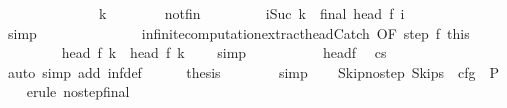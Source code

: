 \begin{isabellebody}
\ \ \ \ \isamarkupfalse%
\ \isanewline
\ \ \ \ \ \ \isamarkupfalse%
\ k\isanewline
\ \ \ \ \ \ \isamarkupfalse%
\ not{\isacharunderscore}fin\ \isanewline
\ \ \ \ \ \ \isamarkupfalse%
\ {\isachardoublequoteopen}{\isasymforall}i{\isacharless}{\isacharparenleft}Suc\ k{\isacharparenright}{\isachardot}\ {\isasymnot}\ final\ {\isacharparenleft}head\ {\isacharparenleft}f\ i{\isacharparenright}{\isacharparenright}{\isachardoublequoteclose}\isanewline
\ \ \ \ \ \ \ \ \isamarkupfalse%
\ simp\isanewline
\ \ \ \ \ \ \isanewline
\ \ \ \ \ \ \isamarkupfalse%
\ infinite{\isacharunderscore}computation{\isacharunderscore}extract{\isacharunderscore}head{\isacharunderscore}Catch\ {\isacharbrackleft}OF\ step\ f{\isacharunderscore}{}\ this\ {\isacharbrackright}\isanewline
\ \ \ \ \ \ \isamarkupfalse%
\ {\isachardoublequoteopen}{\isasymGamma}{\isasymturnstile}\ head\ {\isacharparenleft}f\ k{\isacharparenright}\ {\isasymrightarrow}\ head\ {\isacharparenleft}f\ {\isacharparenleft}k\ {\isacharplus}\ {}{\isacharparenright}{\isacharparenright}{\isachardoublequoteclose}\ \isamarkupfalse%
\ simp\isanewline
\ \ \ \ \isamarkupfalse%
\isanewline
\ \ \ \ \isamarkupfalse%
\ head{\isacharunderscore}f{\isacharunderscore}{}\ \isamarkupfalse%
\ {\isachardoublequoteopen}{\isasymGamma}{\isasymturnstile}{\isacharparenleft}cs{\isacharparenright}\ {\isasymrightarrow}\ {\isasymdots}{\isacharparenleft}{\isasyminfinity}{\isacharparenright}{\isachardoublequoteclose}\isanewline
\ \ \ \ \ \ \isamarkupfalse%
\ {\isacharparenleft}auto\ simp\ add{\isacharcolon}\ inf{\isacharunderscore}def{\isacharparenright}\isanewline
\ \ \ \ \isamarkupfalse%
\ {\isacharquery}thesis\isanewline
\ \ \ \ \ \ \isamarkupfalse%
\ simp\isanewline
\ \ \isamarkupfalse%
\isanewline
{}\isamarkupfalse%
%
\endisatagproof
{\isafoldproof}%
%
\isadelimproof
\isanewline
%
\endisadelimproof
\isanewline
{}\isamarkupfalse%
\ Skip{\isacharunderscore}no{\isacharunderscore}step{\isacharcolon}\ {\isachardoublequoteopen}{\isasymGamma}{\isasymturnstile}{\isacharparenleft}Skip{\isacharcomma}s{\isacharparenright}\ {\isasymrightarrow}\ cfg\ {\isasymLongrightarrow}\ P{\isachardoublequoteclose}\isanewline
%
\isadelimproof
\ \ %
\endisadelimproof
%
\isatagproof
{}\isamarkupfalse%
\ {\isacharparenleft}erule\ no{\isacharunderscore}step{\isacharunderscore}final{\isacharprime}{\isacharparenright}\isanewline

\end{isabellebody}
